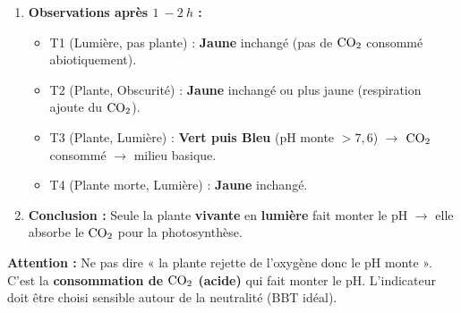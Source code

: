 \documentclass[11pt]{article}
\begin{document}
\begin{methode}
\begin{enumerate}
        \item \textbf{Observations après $\SI{1}{-}\SI{2}{h}$ :}
            \begin{itemize}
                \item T1 (Lumière, pas plante) : \textbf{Jaune} inchangé (pas de $\ce{CO2}$ consommé abiotiquement).
                \item T2 (Plante, Obscurité) : \textbf{Jaune} inchangé ou plus jaune (respiration ajoute du $\ce{CO2}$).
                \item T3 (Plante, Lumière) : \textbf{Vert puis Bleu} (pH monte $> 7,6$) $\rightarrow$ $\ce{CO2}$ consommé $\rightarrow$ milieu basique.
                \item T4 (Plante morte, Lumière) : \textbf{Jaune} inchangé.
            \end{itemize}
        \item \textbf{Conclusion :} Seule la plante \textbf{vivante} en \textbf{lumière} fait monter le pH $\rightarrow$ elle absorbe le $\ce{CO2}$ pour la photosynthèse.
    \end{enumerate}
    \textbf{Attention :} Ne pas dire « la plante rejette de l'oxygène donc le pH monte ». C'est la \textbf{consommation de $\ce{CO2}$ (acide)} qui fait monter le pH. L'indicateur doit être choisi sensible autour de la neutralité (BBT idéal).
\end{methode}
\end{document}
